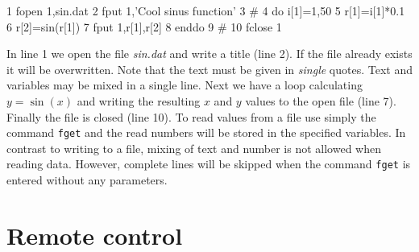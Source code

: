 \footnotesize
\begin{MacVerbatim}
      1  fopen 1,sin.dat
      2  fput 1,'Cool sinus function'
      3  #
      4  do i[1]=1,50
      5     r[1]=i[1]*0.1
      6     r[2]=sin(r[1])
      7     fput 1,r[1],r[2]
      8  enddo
      9  #
     10  fclose 1
\end{MacVerbatim}
\normalsize

In line 1 we open the file {\it sin.dat} and write a title (line 2).
If the file already exists it will be overwritten. Note that the
text must be given in {\it single} quotes. Text and variables may be
mixed in a single line. Next we have a loop calculating $y=\sin(x)$
and writing the resulting $x$ and $y$ values to the open file (line
7). Finally the file is closed (line 10). To read values from a file
use simply the command {\tt fget} and the read numbers will be
stored in the specified variables. In contrast to writing to a file,
mixing of text and number is not allowed when reading data. However,
complete lines will be skipped when the command {\tt fget} is
entered without any parameters.


\section{Remote control\label{remote}}

